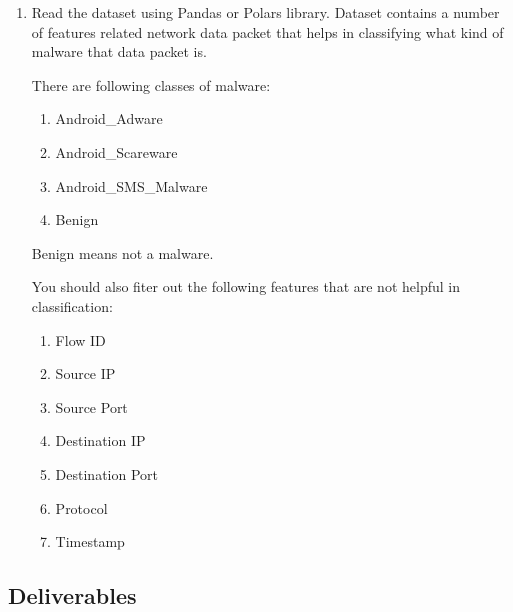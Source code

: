 \documentclass[12pt, xcolor=dvipsnames,svgnames,x11names]{article}
\begin{document}
\begin{enumerate}
\item Read the dataset using Pandas or Polars library. Dataset contains a number of features related network data packet that helps in classifying what kind of malware that data packet is.

There are following classes of malware:

\begin{enumerate}
\item Android\_Adware
\item Android\_Scareware
\item Android\_SMS\_Malware
\item Benign
\end{enumerate}

Benign  means not a malware.

You should also fiter out the following features that are not helpful in classification:

\begin{enumerate}
\item Flow ID	 \item Source IP	 \item Source Port	 \item Destination IP	 \item Destination Port	 \item Protocol	 \item Timestamp
\end{enumerate}

\end{enumerate}

\subsection{Deliverables}
\end{document}
